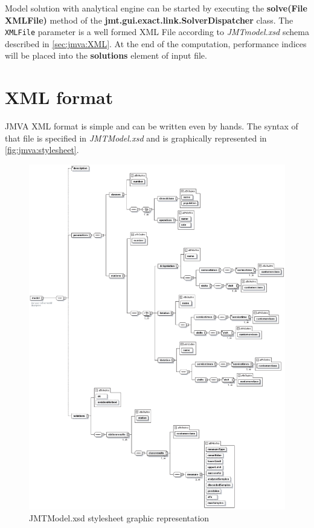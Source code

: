 Model solution with analytical engine can be started by executing
the \textbf{solve(File XMLFile)} method of the
\textbf{jmt.gui.exact.link.SolverDispatcher} class. The
\texttt{XMLFile} parameter is a well formed XML File according to
\emph{JMTmodel.xsd} schema described in \autoref{sec:jmva:XML}. At
the end of the computation, performance indices will be placed into
the \textbf{solutions} element of input file.

\section{XML format}
\label{sec:jmva:XML}
\lstset{language=XML,usekeywordsintag=true, basicstyle=\small} JMVA
XML format is simple and can be written even by hands. The syntax of
that file is specified in \emph{JMTModel.xsd} and is graphically
represented in \autoref{fig:jmva:stylesheet}.

\begin{figure}[p]
    \begin{center}
        \includegraphics[width=1\textwidth]{img/jmva/JMTmodel}
    \end{center}
    \caption{JMTModel.xsd stylesheet graphic representation}
    \label{fig:jmva:stylesheet}
\end{figure}

